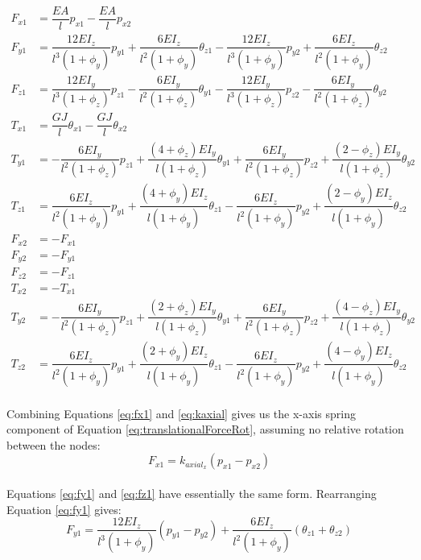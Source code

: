 {\begin{subequations}
\begin{align} 
\label{eq:fx1}
F_{x1} &=  \dfrac{EA}{l}p_{x1} - \dfrac{EA}{l}p_{x2} \\[10pt]
\label{eq:fy1}
F_{y1} &=  \dfrac{12EI_z}{l^3(1+\phi_y)}p_{y1} + \dfrac{6EI_z}{l^2(1+\phi_y)}\theta_{z1} - \dfrac{12EI_z}{l^3(1+\phi_y)}p_{y2} + \dfrac{6EI_z}{l^2(1+\phi_y)}\theta_{z2}\\[10pt]
\label{eq:fz1}
F_{z1} &=  \dfrac{12EI_y}{l^3(1+\phi_z)}p_{z1} - \dfrac{6EI_y}{l^2(1+\phi_z)}\theta_{y1} - \dfrac{12EI_y}{l^3(1+\phi_z)}p_{z2} - \dfrac{6EI_y}{l^2(1+\phi_z)}\theta_{y2}\\[10pt]
\label{eq:tx1}
T_{x1} &=  \dfrac{GJ}{l}\theta_{x1} - \dfrac{GJ}{l}\theta_{x2} \\[10pt]
\label{eq:ty1}
T_{y1} &= - \dfrac{6EI_y}{l^2(1+\phi_z)}p_{z1} + \dfrac{(4+\phi_z)EI_y}{l(1+\phi_z)}\theta_{y1}  + \dfrac{6EI_y}{l^2(1+\phi_z)}p_{z2} + \dfrac{(2-\phi_z)EI_y}{l(1+\phi_z)}\theta_{y2} \\[10pt]
\label{eq:tz1}
T_{z1} &=  \dfrac{6EI_z}{l^2(1+\phi_y)}p_{y1} + \dfrac{(4+\phi_y)EI_z}{l(1+\phi_y)}\theta_{z1}  - \dfrac{6EI_z}{l^2(1+\phi_y)}p_{y2} + \dfrac{(2-\phi_y)EI_z}{l(1+\phi_y)}\theta_{z2} \\[10pt]
\label{eq:fx2}
F_{x2} &=  -F_{x1}\\[10pt]
\label{eq:fy2}
F_{y2} &=  -F_{y1}\\[10pt]
\label{eq:fz2}
F_{z2} &=  -F_{z1}\\[10pt]
\label{eq:tx2}
T_{x2} &=  -T_{x1}\\[10pt]
\label{eq:ty2}
T_{y2} &=  - \dfrac{6EI_y}{l^2(1+\phi_z)}p_{z1} + \dfrac{(2+\phi_z)EI_y}{l(1+\phi_z)}\theta_{y1}  + \dfrac{6EI_y}{l^2(1+\phi_z)}p_{z2} + \dfrac{(4-\phi_z)EI_y}{l(1+\phi_z)}\theta_{y2} \\[10pt]
\label{eq:tz2}
T_{z2} &= \dfrac{6EI_z}{l^2(1+\phi_y)}p_{y1} + \dfrac{(2+\phi_y)EI_z}{l(1+\phi_y)}\theta_{z1}  - \dfrac{6EI_z}{l^2(1+\phi_y)}p_{y2} + \dfrac{(4-\phi_y)EI_z}{l(1+\phi_y)}\theta_{z2}
\end{align}
\end{subequations}\\

Combining Equations \ref{eq:fx1} and \ref{eq:kaxial} gives us the x-axis spring component of Equation \ref{eq:translationalForceRot}, assuming no relative rotation between the nodes:
\[F_{x1} =  k_{axial_x}(p_{x1} - p_{x2}) \]\\

Equations \ref{eq:fy1} and \ref{eq:fz1} have essentially the same form.  Rearranging Equation \ref{eq:fy1} gives:
\[ F_{y1} =  \dfrac{12EI_z}{l^3(1+\phi_y)} (p_{y1} -p_{y2}) + \dfrac{6EI_z}{l^2(1+\phi_y)}(\theta_{z1} + \theta_{z2}) \]\\

}
